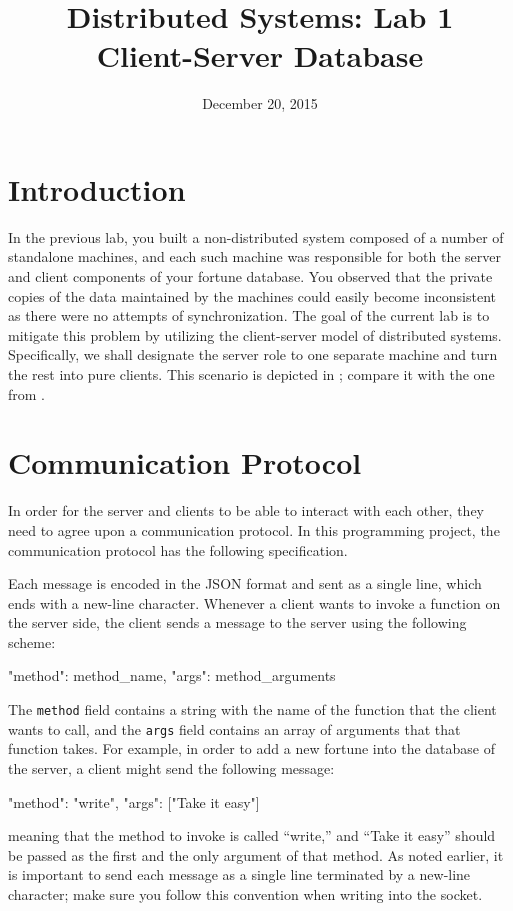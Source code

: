 \documentclass[a4paper]{article}
\title{Distributed Systems: Lab 1\\Client-Server Database}
\author{}
\date{December 20, 2015}
\begin{document}
\maketitle

\section{Introduction}

In the previous lab, you built a non-distributed system composed of a number of
standalone machines, and each such machine was responsible for both the server
and client components of your fortune database. You observed that the private
copies of the data maintained by the machines could easily become inconsistent
as there were no attempts of synchronization. The goal of the current lab is to
mitigate this problem by utilizing the client-server model \cite{lecture2} of
distributed systems. Specifically, we shall designate the server role to one
separate machine and turn the rest into pure clients. This scenario is depicted
in ; compare it with the one from .

\section{Communication Protocol} 
In order for the server and clients to be able to interact with each other, they
need to agree upon a communication protocol. In this programming project, the
communication protocol has the following specification.

Each message is encoded in the JSON format \cite{json, python-json} and sent as
a single line, which ends with a new-line character. Whenever a client wants to
invoke a function on the server side, the client sends a message to the server
using the following scheme:
\begin{json}
{
    "method": method_name,
    "args": method_arguments
}
\end{json}
The \texttt{method} field contains a string with the name of the function that
the client wants to call, and the \texttt{args} field contains an array of
arguments that that function takes. For example, in order to add a new fortune
into the database of the server, a client might send the following message:
\begin{json}
{
    "method": "write",
    "args": ["Take it easy"]
}
\end{json}
meaning that the method to invoke is called ``write,'' and ``Take it easy''
should be passed as the first and the only argument of that method. As noted
earlier, it is important to send each message as a single line terminated by a
new-line character; make sure you follow this convention when writing into the
socket.
\end{document}

